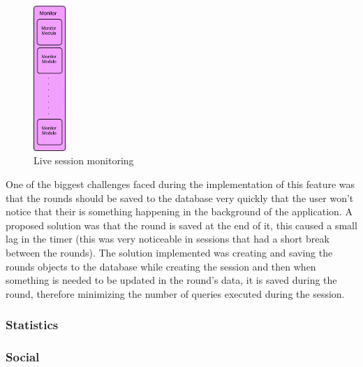 \documentclass[a4paper]{article}
\begin{document}
\begin{figure}[h!]
\centering
\includegraphics[height=55mm]{Monitor.png}
\caption{Live session monitoring}
\label{threadsVsSync}
\end{figure}

One of the biggest challenges faced during the implementation of this feature was that the rounds should be saved to the database very quickly that the user won't notice that their is something happening in the background of the application. A proposed solution was that the round is saved at the end of it, this caused a small lag in the timer (this was very noticeable in sessions that had a short break between the rounds). The solution implemented was creating and saving the rounds objects to the database while creating the session and then when something is needed to be updated in the round's data, it is saved during the round, therefore minimizing the number of queries executed during the session.

\subsubsection{Statistics}

\subsubsection{Social}
\end{document}
